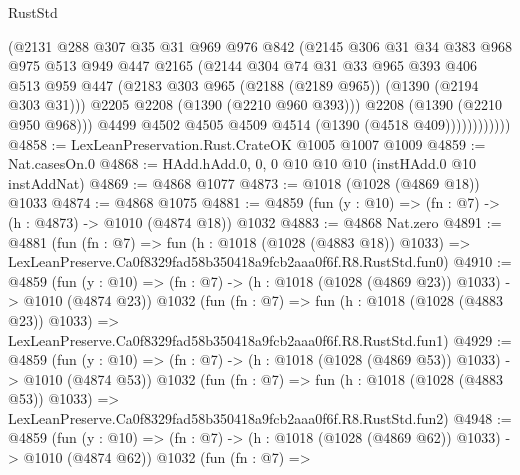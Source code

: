 \begin{lexlean}{RustStd}
\begin{coremodule}
                      (@2131
                        @288
                        @307
                        @35
                        @31
                        @969
                        @976
                        @842
                        (@2145
                          @306
                          @31
                          @34
                          @383
                          @968
                          @975
                          @513
                          @949
                          @447
                          @2165
                          (@2144
                            @304
                            @74
                            @31
                            @33
                            @965
                            @393
                            @406
                            @513
                            @959
                            @447
                            (@2183 @303 @965 (@2188 (@2189 @965)) (@1390 (@2194 @303 @31)))
                            @2205
                            @2208
                            (@1390 (@2210 @960 @393)))
                          @2208
                          (@1390 (@2210 @950 @968)))
                        @4499
                        @4502
                        @4505
                        @4509
                        @4514
                        (@1390 (@4518 @409))))))))))))
@4858 := LexLeanPreservation.Rust.CrateOK @1005 @1007 @1009
@4859 := Nat.casesOn.{0}
@4868 := HAdd.hAdd.{0, 0, 0} @10 @10 @10 (instHAdd.{0} @10 instAddNat)
@4869 := @4868 @1077
@4873 := @1018 (@1028 (@4869 @18)) @1033
@4874 := @4868 @1075
@4881 := @4859 (fun (y : @10) => (fn : @7) -> (h : @4873) -> @1010 (@4874 @18)) @1032
@4883 := @4868 Nat.zero
@4891 := @4881
    (fun (fn : @7) =>
    fun (h : @1018 (@1028 (@4883 @18)) @1033) =>
    LexLeanPreserve.Ca0f8329fad58b350418a9fcb2aaa0f6f.R8.RustStd.fun0)
@4910 := @4859
    (fun (y : @10) => (fn : @7) -> (h : @1018 (@1028 (@4869 @23)) @1033) -> @1010 (@4874 @23))
    @1032
    (fun (fn : @7) =>
    fun (h : @1018 (@1028 (@4883 @23)) @1033) =>
    LexLeanPreserve.Ca0f8329fad58b350418a9fcb2aaa0f6f.R8.RustStd.fun1)
@4929 := @4859
    (fun (y : @10) => (fn : @7) -> (h : @1018 (@1028 (@4869 @53)) @1033) -> @1010 (@4874 @53))
    @1032
    (fun (fn : @7) =>
    fun (h : @1018 (@1028 (@4883 @53)) @1033) =>
    LexLeanPreserve.Ca0f8329fad58b350418a9fcb2aaa0f6f.R8.RustStd.fun2)
@4948 := @4859
    (fun (y : @10) => (fn : @7) -> (h : @1018 (@1028 (@4869 @62)) @1033) -> @1010 (@4874 @62))
    @1032
    (fun (fn : @7) =>

\end{coremodule}
\end{lexlean}
